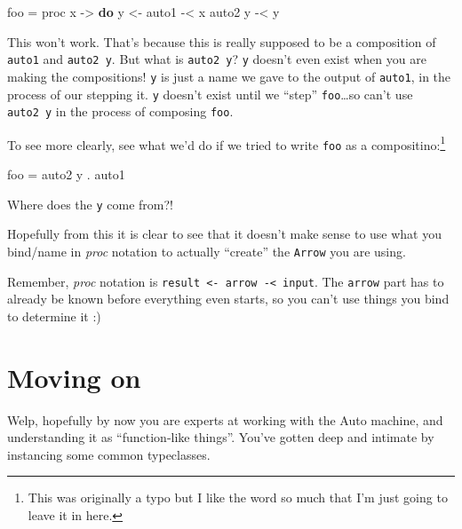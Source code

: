 \documentclass[]{article}
\newenvironment{Shaded}{}{}
\newcommand{\KeywordTok}[1]{\textcolor[rgb]{0.00,0.44,0.13}{\textbf{#1}}}
\newcommand{\NormalTok}[1]{#1}
\newcommand{\OperatorTok}[1]{\textcolor[rgb]{0.40,0.40,0.40}{#1}}
\newcommand{\OtherTok}[1]{\textcolor[rgb]{0.00,0.44,0.13}{#1}}
\begin{document}
\begin{Shaded}
\begin{Highlighting}[]
\NormalTok{foo }\OtherTok{=}\NormalTok{ proc x }\OtherTok{{-}\textgreater{}} \KeywordTok{do}
\NormalTok{    y }\OtherTok{\textless{}{-}}\NormalTok{ auto1 }\OperatorTok{{-}\textless{}}\NormalTok{ x}
\NormalTok{    auto2 y }\OperatorTok{{-}\textless{}}\NormalTok{ y}
\end{Highlighting}
\end{Shaded}

This won't work. That's because this is really supposed to be a composition of
\texttt{auto1} and \texttt{auto2\ y}. But what is \texttt{auto2\ y}? \texttt{y}
doesn't even exist when you are making the compositions! \texttt{y} is just a
name we gave to the output of \texttt{auto1}, in the process of our stepping it.
\texttt{y} doesn't exist until we ``step'' \texttt{foo}\ldots so can't use
\texttt{auto2\ y} in the process of composing \texttt{foo}.

To see more clearly, see what we'd do if we tried to write \texttt{foo} as a
compositino:\footnote{This was originally a typo but I like the word so much
  that I'm just going to leave it in here.}

\begin{Shaded}
\begin{Highlighting}[]
\NormalTok{foo }\OtherTok{=}\NormalTok{ auto2 y }\OperatorTok{.}\NormalTok{ auto1}
\end{Highlighting}
\end{Shaded}

Where does the \texttt{y} come from?!

Hopefully from this it is clear to see that it doesn't make sense to use what
you bind/name in \emph{proc} notation to actually ``create'' the \texttt{Arrow}
you are using.

Remember, \emph{proc} notation is
\texttt{result\ \textless{}-\ arrow\ -\textless{}\ input}. The \texttt{arrow}
part has to already be known before everything even starts, so you can't use
things you bind to determine it :)

\section{Moving on}\label{moving-on}

Welp, hopefully by now you are experts at working with the Auto machine, and
understanding it as ``function-like things''. You've gotten deep and intimate by
instancing some common typeclasses.
\end{document}
